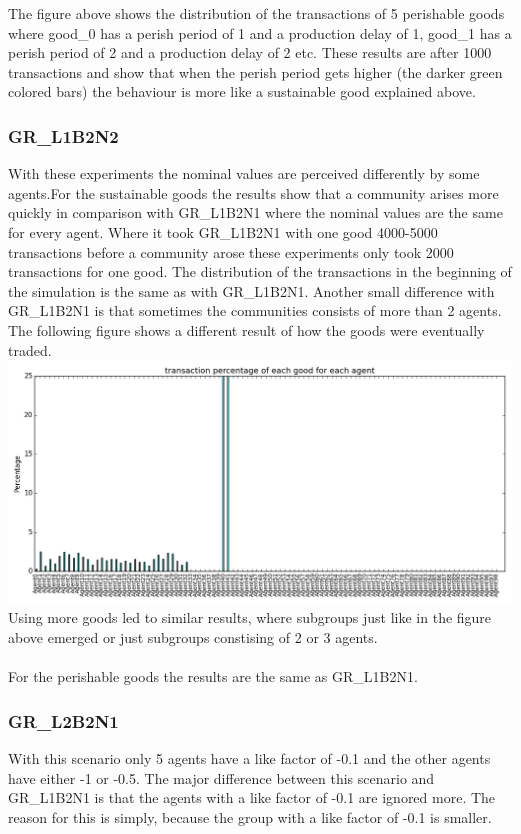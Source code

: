 \documentclass[twoside,openright]{uva-bachelor-thesis}
\begin{document}
The figure above shows the distribution of the transactions of 5 perishable goods where good\_0 has a perish period of 1 and a production delay of 1, good\_1 has a perish period of 2 and a production delay of 2 etc. These results are after 1000 transactions and show that when the perish period gets higher (the darker green colored bars) the behaviour is more like a sustainable good explained above.

\subsubsection{GR\_L1B2N2}
With these experiments the nominal values are perceived differently by some agents.For the sustainable goods the results show that a community arises more quickly in comparison with GR\_L1B2N1 where the nominal values are the same for every agent. Where it took GR\_L1B2N1 with one good 4000-5000 transactions before a community arose these experiments only took 2000 transactions for one good. The distribution of the transactions in the beginning of the simulation is the same as with GR\_L1B2N1. Another small difference with  GR\_L1B2N1 is that sometimes the communities consists of more than 2 agents. The following figure shows a different result of how the goods were eventually traded. \\
\includegraphics[scale=0.4]{GR_L1B2N2/15ktransactions2goods} \\
Using more goods led to similar results, where subgroups just like in the figure above emerged or just subgroups constising of 2 or 3 agents.
\\
\\
For the perishable goods the results are the same as GR\_L1B2N1.
\subsubsection{GR\_L2B2N1}
With this scenario only 5 agents have a like factor of -0.1 and the other agents have either -1 or -0.5. The major difference between this scenario and GR\_L1B2N1 is that the agents with a like factor of -0.1 are ignored more. The reason for this is simply, because the group with a like factor of -0.1 is smaller.
\end{document}

